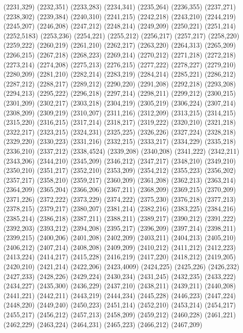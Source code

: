 (2231,329)
(2232,351)
(2233,283)
(2234,341)
(2235,264)
(2236,355)
(2237,271)
(2238,302)
(2239,384)
(2240,310)
(2241,215)
(2242,218)
(2243,210)
(2244,219)
(2245,207)
(2246,208)
(2247,212)
(2248,214)
(2249,209)
(2250,221)
(2251,214)
(2252,5183)
(2253,236)
(2254,221)
(2255,212)
(2256,217)
(2257,217)
(2258,220)
(2259,222)
(2260,219)
(2261,210)
(2262,217)
(2263,220)
(2264,313)
(2265,209)
(2266,215)
(2267,218)
(2268,223)
(2269,214)
(2270,212)
(2271,218)
(2272,218)
(2273,214)
(2274,208)
(2275,213)
(2276,215)
(2277,222)
(2278,227)
(2279,210)
(2280,209)
(2281,210)
(2282,214)
(2283,219)
(2284,214)
(2285,221)
(2286,212)
(2287,212)
(2288,217)
(2289,212)
(2290,220)
(2291,208)
(2292,218)
(2293,208)
(2294,213)
(2295,222)
(2296,218)
(2297,214)
(2298,211)
(2299,212)
(2300,215)
(2301,209)
(2302,217)
(2303,218)
(2304,219)
(2305,219)
(2306,224)
(2307,214)
(2308,209)
(2309,219)
(2310,207)
(2311,216)
(2312,209)
(2313,215)
(2314,215)
(2315,220)
(2316,215)
(2317,214)
(2318,217)
(2319,222)
(2320,210)
(2321,218)
(2322,217)
(2323,215)
(2324,231)
(2325,225)
(2326,226)
(2327,224)
(2328,218)
(2329,220)
(2330,223)
(2331,216)
(2332,215)
(2333,217)
(2334,229)
(2335,218)
(2336,210)
(2337,212)
(2338,4524)
(2339,208)
(2340,208)
(2341,222)
(2342,211)
(2343,206)
(2344,210)
(2345,209)
(2346,212)
(2347,217)
(2348,210)
(2349,210)
(2350,210)
(2351,217)
(2352,210)
(2353,209)
(2354,212)
(2355,223)
(2356,202)
(2357,217)
(2358,210)
(2359,217)
(2360,209)
(2361,208)
(2362,213)
(2363,214)
(2364,209)
(2365,204)
(2366,206)
(2367,211)
(2368,209)
(2369,215)
(2370,209)
(2371,226)
(2372,222)
(2373,229)
(2374,222)
(2375,230)
(2376,218)
(2377,213)
(2378,215)
(2379,217)
(2380,207)
(2381,214)
(2382,216)
(2383,225)
(2384,216)
(2385,214)
(2386,218)
(2387,211)
(2388,211)
(2389,217)
(2390,212)
(2391,222)
(2392,203)
(2393,212)
(2394,208)
(2395,217)
(2396,209)
(2397,214)
(2398,211)
(2399,215)
(2400,206)
(2401,208)
(2402,209)
(2403,211)
(2404,213)
(2405,210)
(2406,212)
(2407,214)
(2408,208)
(2409,209)
(2410,212)
(2411,212)
(2412,223)
(2413,224)
(2414,217)
(2415,228)
(2416,219)
(2417,220)
(2418,212)
(2419,205)
(2420,210)
(2421,214)
(2422,206)
(2423,4009)
(2424,225)
(2425,226)
(2426,232)
(2427,233)
(2428,226)
(2429,224)
(2430,234)
(2431,245)
(2432,235)
(2433,222)
(2434,227)
(2435,300)
(2436,229)
(2437,210)
(2438,211)
(2439,211)
(2440,208)
(2441,221)
(2442,211)
(2443,219)
(2444,234)
(2445,228)
(2446,223)
(2447,224)
(2448,220)
(2449,240)
(2450,223)
(2451,214)
(2452,210)
(2453,214)
(2454,217)
(2455,217)
(2456,212)
(2457,213)
(2458,209)
(2459,212)
(2460,228)
(2461,221)
(2462,229)
(2463,224)
(2464,231)
(2465,223)
(2466,212)
(2467,209)

